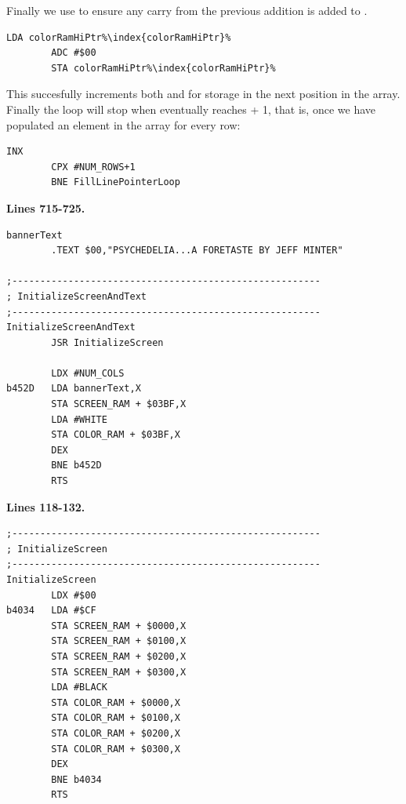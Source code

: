 Finally we use  to ensure any carry from the previous addition is added to . 

\begin{lstlisting}[escapechar=\%]
        LDA colorRamHiPtr%\index{colorRamHiPtr}%
        ADC #$00
        STA colorRamHiPtr%\index{colorRamHiPtr}%
\end{lstlisting}

This succesfully increments both  and  for storage in the next position in
the array. Finally the loop will stop when  eventually reaches  + 1, that is, once we have
populated an element in the array for every row:

\begin{lstlisting}[escapechar=\%]
        INX 
        CPX #NUM_ROWS+1
        BNE FillLinePointerLoop
\end{lstlisting}
%

\clearpage
\textbf{Lines 715-725. }
\begin{lstlisting}[caption = A routine that fills the screen with black and the title text.,escapechar=\%]
bannerText   
        .TEXT $00,"PSYCHEDELIA...A FORETASTE BY JEFF MINTER"

;-------------------------------------------------------
; InitializeScreenAndText
;-------------------------------------------------------
InitializeScreenAndText   
        JSR InitializeScreen

        LDX #NUM_COLS
b452D   LDA bannerText,X
        STA SCREEN_RAM + $03BF,X
        LDA #WHITE
        STA COLOR_RAM + $03BF,X
        DEX 
        BNE b452D
        RTS 
\end{lstlisting}

\bigskip
\bigskip
\bigskip
\bigskip
\bigskip
\textbf{Lines 118-132. }
\begin{lstlisting}[caption = Fills the screen with black,escapechar=\%]
;-------------------------------------------------------
; InitializeScreen
;-------------------------------------------------------
InitializeScreen   
        LDX #$00
b4034   LDA #$CF
        STA SCREEN_RAM + $0000,X
        STA SCREEN_RAM + $0100,X
        STA SCREEN_RAM + $0200,X
        STA SCREEN_RAM + $0300,X
        LDA #BLACK
        STA COLOR_RAM + $0000,X
        STA COLOR_RAM + $0100,X
        STA COLOR_RAM + $0200,X
        STA COLOR_RAM + $0300,X
        DEX 
        BNE b4034
        RTS 

\end{lstlisting}
\clearpage

